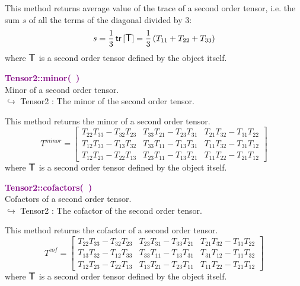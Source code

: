 This method returns average value of the trace of a second order tensor, i.e. the sum $s$ of all the terms of the diagonal divided by 3:
\begin{equation*}
s = \frac{1}{3} \mbox{\ensuremath{\mathsf{\,tr\,}}}[\mbox{\large\ensuremath{\mathsf{T}}}] =  \frac{1}{3} \left( T_{11}+T_{22}+T_{33} \right)
\end{equation*}
where $\mbox{\large\ensuremath{\mathsf{T}}}$ is a second order tensor defined by the object itself.

\textcolor{purple}{\textbf{Tensor2::minor(~)}}\label{Tensor2::minor()}\\
Minor of a second order tensor.\\ \hspace*{10mm}$\hookrightarrow$ Tensor2 : The minor of the second order tensor.

This method returns the minor of a second order tensor.
\begin{equation*}
T^{minor} = \left[\begin{array}{ccc}
T_{22}T_{33}-T_{32}T_{23} & T_{33}T_{21}-T_{23}T_{31} & T_{21}T_{32}-T_{31}T_{22}\\
T_{12}T_{33}-T_{13}T_{32} & T_{33}T_{11}-T_{13}T_{31} & T_{11}T_{32}-T_{31}T_{12}\\
T_{12}T_{23}-T_{22}T_{13} & T_{23}T_{11}-T_{13}T_{21} & T_{11}T_{22}-T_{21}T_{12}
\end{array}
\right]
\end{equation*}
where $\mbox{\large\ensuremath{\mathsf{T}}}$ is a second order tensor defined by the object itself.

\textcolor{purple}{\textbf{Tensor2::cofactors(~)}}\label{Tensor2::cofactors()}\\
Cofactors of a second order tensor.\\ \hspace*{10mm}$\hookrightarrow$ Tensor2 : The cofactor of the second order tensor.

This method returns the cofactor of a second order tensor.
\begin{equation*}
T^{cof} = \left[\begin{array}{ccc}
T_{22}T_{33}-T_{32}T_{23} & T_{23}T_{31}-T_{33}T_{21} & T_{21}T_{32}-T_{31}T_{22}\\
T_{13}T_{32}-T_{12}T_{33} & T_{33}T_{11}-T_{13}T_{31} & T_{31}T_{12}-T_{11}T_{32}\\
T_{12}T_{23}-T_{22}T_{13} & T_{13}T_{21}-T_{23}T_{11} & T_{11}T_{22}-T_{21}T_{12}
\end{array}
\right]
\end{equation*}
where $\mbox{\large\ensuremath{\mathsf{T}}}$ is a second order tensor defined by the object itself.

